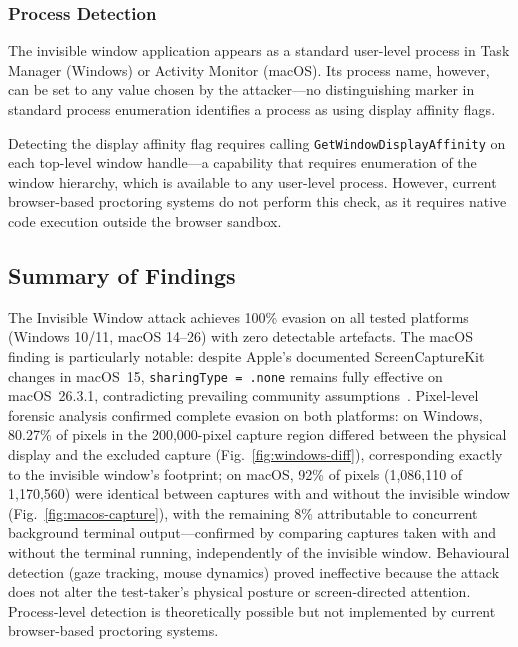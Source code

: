 \documentclass[conference]{IEEEtran}
\begin{document}
\subsubsection{Process Detection}

The invisible window application appears as a standard user-level process in Task Manager (Windows) or Activity Monitor (macOS). Its process name, however, can be set to any value chosen by the attacker---no distinguishing marker in standard process enumeration identifies a process as using display affinity flags.

Detecting the display affinity flag requires calling \texttt{GetWindowDisplayAffinity} on each top-level window handle---a capability that requires enumeration of the window hierarchy, which is available to any user-level process. However, current browser-based proctoring systems do not perform this check, as it requires native code execution outside the browser sandbox.

\subsection{Summary of Findings}

The Invisible Window attack achieves 100\% evasion on all tested platforms (Windows 10/11, macOS 14--26) with zero detectable artefacts. The macOS finding is particularly notable: despite Apple's documented ScreenCaptureKit changes in macOS~15, \texttt{sharingType = .none} remains fully effective on macOS~26.3.1, contradicting prevailing community assumptions~\cite{columbusux2025screencapturekit}. Pixel-level forensic analysis confirmed complete evasion on both platforms: on Windows, 80.27\% of pixels in the 200,000-pixel capture region differed between the physical display and the excluded capture (Fig.~\ref{fig:windows-diff}), corresponding exactly to the invisible window's footprint; on macOS, 92\% of pixels (1,086,110 of 1,170,560) were identical between captures with and without the invisible window (Fig.~\ref{fig:macos-capture}), with the remaining 8\% attributable to concurrent background terminal output---confirmed by comparing captures taken with and without the terminal running, independently of the invisible window. Behavioural detection (gaze tracking, mouse dynamics) proved ineffective because the attack does not alter the test-taker's physical posture or screen-directed attention. Process-level detection is theoretically possible but not implemented by current browser-based proctoring systems.
\end{document}
